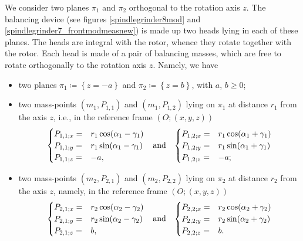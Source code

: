 \documentclass{aims}
\theoremstyle{definition}
\begin{document}
	We consider two planes $\pi_1$ and $\pi_2$ orthogonal to the rotation axis $z$. The balancing device (see figures \ref{spindlegrinder8mod} and \ref{spindlegrinder7_frontmodmeasnew}) is made up two heads lying in each of these planes. The heads are integral with the rotor, whence they rotate together with the rotor. Each head is made of a pair of balancing masses, which are free to rotate orthogonally to the rotation axis $z$.  Namely, we have
	\begin{itemize}
		\item two planes $\pi_1\coloneqq \left\{z=-a\right\}$ and $\pi_2\coloneqq \left\{z=b\right\}$, with $a$, $b\geq 0$;
		\item two mass-points $(m_1,P_{1,1})$ and $(m_1,P_{1,2})$ lying on $\pi_1$ at distance $r_1$ from the axis $z$, i.e., in the reference frame $(O;(x,y,z))$
		\begin{equation}\label{P1}
		\begin{cases}
		P_{1,1;x}=&r_1\cos(\alpha_1-\gamma_1)\\
		P_{1,1;y}=&r_1\sin(\alpha_1-\gamma_1)\\
		P_{1,1;z}=&-a,\\
		\end{cases}
		\hspace{0.3 cm}\mbox{and}\hspace{0.3 cm}
		\begin{cases}
		P_{1,2;x}=&r_1\cos(\alpha_1+\gamma_1)\\
		P_{1,2;y}=&r_1\sin(\alpha_1+\gamma_1)\\
		P_{1,2;z}=&-a;\\
		\end{cases}
		\end{equation}
		\item two mass-points $(m_2,P_{2,1})$ and $(m_2,P_{2,2})$ lying on $\pi_2$ at distance $r_2$ from the axis $z$, namely, in the reference frame $(O;(x,y,z))$
		\begin{equation}\label{P2}
		\begin{cases}
		P_{2,1;x}=&r_2\cos(\alpha_2-\gamma_2)\\
		P_{2,1;y}=&r_2\sin(\alpha_2-\gamma_2)\\
		P_{2,1;z}=&b,\\
		\end{cases}
		\hspace{0.3 cm}\mbox{and}\hspace{0.3 cm}
		\begin{cases}
		P_{2,2;x}=&r_2\cos(\alpha_2+\gamma_2)\\
		P_{2,2;y}=&r_2\sin(\alpha_2+\gamma_2)\\
		P_{2,2;z}=&b.\\
		\end{cases}
		\end{equation}
	\end{itemize}
\end{document}
